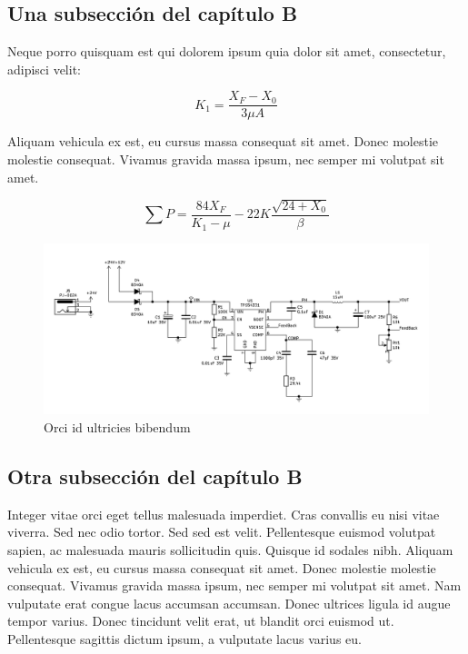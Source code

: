 \subsection{Una subsecci\'on del cap\'itulo B}		
Neque porro quisquam est qui dolorem ipsum quia dolor sit amet, consectetur, adipisci velit:
		
\begin{equation}
	K_{1} = \frac{X_{F} - X_{0}}{3 \mu A}
\end{equation}

Aliquam vehicula ex est, eu cursus massa consequat sit amet. Donec molestie molestie consequat. Vivamus gravida massa ipsum, nec semper mi volutpat sit amet.

\begin{equation}
	\sum{P} = \frac{84 X_{F}}{K_{1} - \mu } - 22K \frac{\sqrt{24 + X_{0}}}{\beta}
\end{equation}

\begin{figure}[h]
    \centering
    \includegraphics[width=\textwidth]{figures/chapterB/fuente.png}
    \caption{Orci id ultricies bibendum}
    \label{B_fuente}
\end{figure}

\subsection{Otra subsecci\'on del cap\'itulo B}	

Integer vitae orci eget tellus malesuada imperdiet. Cras convallis eu nisi vitae viverra. Sed nec odio tortor. Sed sed est velit. Pellentesque euismod volutpat sapien, ac malesuada mauris sollicitudin quis. Quisque id sodales nibh. Aliquam vehicula ex est, eu cursus massa consequat sit amet. Donec molestie molestie consequat. Vivamus gravida massa ipsum, nec semper mi volutpat sit amet. Nam vulputate erat congue lacus accumsan accumsan. Donec ultrices ligula id augue tempor varius. Donec tincidunt velit erat, ut blandit orci euismod ut. Pellentesque sagittis dictum ipsum, a vulputate lacus varius eu.	
